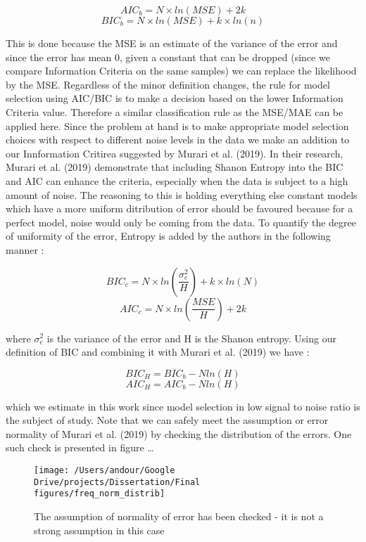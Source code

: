 \documentclass[]{article}
\begin{document}
\[AIC_b = N\times ln(MSE) + 2k\]
\[BIC_b = N \times ln(MSE) + k\times ln(n)\]

This is done because the MSE is an estimate of the variance of the error
and since the error has mean 0, given a constant that can be dropped
(since we compare Information Criteria on the same samples) we can
replace the likelihood by the MSE. Regardless of the minor definition
changes, the rule for model selection using AIC/BIC is to make a
decision based on the lower Information Criteria value. Therefore a
similar classification rule as the MSE/MAE can be applied here. Since
the problem at hand is to make appropriate model selection choices with
respect to different noise levels in the data we make an addition to our
Innformation Critirea suggested by Murari et al. (2019). In their
research, Murari et al. (2019) demonstrate that including Shanon Entropy
into the BIC and AIC can enhance the criteria, especially when the data
is subject to a high amount of noise. The reasoning to this is holding
everything else constant models which have a more uniform ditribution of
error should be favoured because for a perfect model, noise would only
be coming from the data. To quantify the degree of uniformity of the
error, Entropy is added by the authors in the following manner :

\[BIC_c = N \times ln(\frac {\sigma_e^2}{H}) + k \times ln(N)\]
\[AIC_c = N \times ln(\frac {MSE}{H}) + 2k\]

where \(\sigma_e^2\) is the variance of the error and H is the Shanon
entropy. Using our definition of BIC and combining it with Murari et al.
(2019) we have :

\[BIC_H = BIC_b - Nln(H)\] \[AIC_H = AIC_b - Nln(H)\]

which we estimate in this work since model selection in low signal to
noise ratio is the subject of study. Note that we can safely meet the
assumption or error normality of Murari et al. (2019) by checking the
distribution of the errors. One such check is presented in figure
\ldots{}

\begin{figure}

{\centering \texttt{[image: /Users/andour/Google Drive/projects/Dissertation/Final figures/freq\_norm\_distrib]} 

}

\caption{The assumption of normality of error has been checked - it is not a strong assumption in this case}\label{fig:unnamed-chunk-3}
\end{figure}
\end{document}
